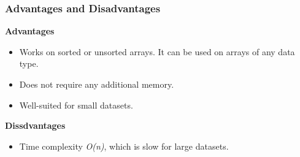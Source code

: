 \subsubsection*{Advantages and Disadvantages}

\textbf{Advantages}

\begin{itemize}
  \item Works on sorted or unsorted arrays. It can be used on arrays of any data type.
  \item Does not require any additional memory.
  \item Well-suited for small datasets.
\end{itemize}

\textbf{Dissdvantages}

\begin{itemize}
  \item Time complexity \textit{O(n)}, which is slow for large datasets.
\end{itemize}
